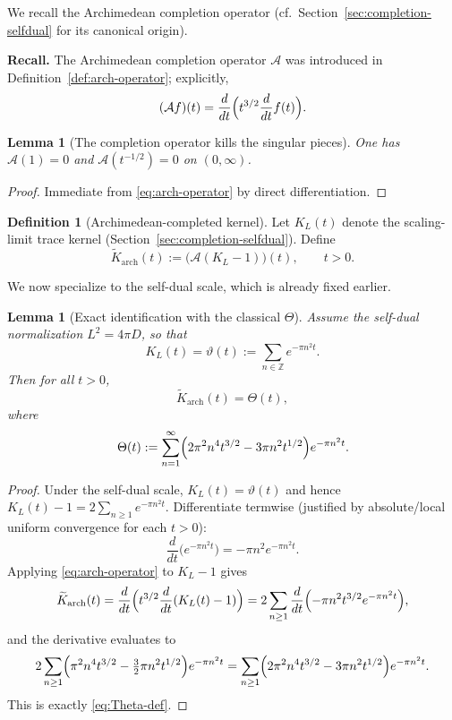 \documentclass[12pt]{amsart}
\newtheorem{lemma}[theorem]{Lemma}
\theoremstyle{definition}
\newtheorem{definition}[theorem]{Definition}
\theoremstyle{remark}
\begin{document}
We recall the Archimedean completion operator (cf.\ Section~\ref{sec:completion-selfdual} for its canonical origin).

\noindent\textbf{Recall.} The Archimedean completion operator $\mathcal A$ was introduced in Definition~\ref{def:arch-operator}; explicitly,
\[
(\mathcal A f)(t)=\frac{d}{dt}\Bigl(t^{3/2}\frac{d}{dt}f(t)\Bigr).
\]



\begin{lemma}[The completion operator kills the singular pieces]
\label{lem:A-kills-singular-new}
One has $\mathcal A(1)=0$ and $\mathcal A(t^{-1/2})=0$ on $(0,\infty)$.
\end{lemma}

\begin{proof}
Immediate from \eqref{eq:arch-operator} by direct differentiation.
\end{proof}

\begin{definition}[Archimedean-completed kernel]
\label{def:arch-kernel-new}
Let $K_L(t)$ denote the scaling-limit trace kernel (Section~\ref{sec:completion-selfdual}). Define
\begin{equation}
\label{eq:Karch-def}
\widetilde K_{\mathrm{arch}}(t)
:=\bigl(\mathcal A (K_L-1)\bigr)(t),\qquad t>0.
\end{equation}
\end{definition}

We now specialize to the self-dual scale, which is already fixed earlier.

\begin{lemma}[Exact identification with the classical $\Theta$]
\label{lem:arch-equals-Theta-new}
Assume the self-dual normalization $L^2=4\pi D$, so that
\[
K_L(t)=\vartheta(t):=\sum_{n\in\mathbb Z}e^{-\pi n^2 t}.
\]
Then for all $t>0$,
\begin{equation}
\label{eq:Karch-equals-Theta}
\widetilde K_{\mathrm{arch}}(t)=\Theta(t),
\end{equation}
where
\begin{equation}
\label{eq:Theta-def}
\Theta(t)
:=\sum_{n=1}^{\infty}\Bigl(2\pi^2 n^4 t^{3/2}-3\pi n^2 t^{1/2}\Bigr)e^{-\pi n^2 t}.
\end{equation}
\end{lemma}

\begin{proof}
Under the self-dual scale, $K_L(t)=\vartheta(t)$ and hence
$K_L(t)-1=2\sum_{n\ge 1}e^{-\pi n^2 t}$.
Differentiate termwise (justified by absolute/local uniform convergence for each $t>0$):
\[
\frac{d}{dt}\bigl(e^{-\pi n^2 t}\bigr)=-\pi n^2 e^{-\pi n^2 t}.
\]
Applying \eqref{eq:arch-operator} to $K_L-1$ gives
\[
\widetilde K_{\mathrm{arch}}(t)
=
\frac{d}{dt}\Bigl(t^{3/2}\frac{d}{dt}(K_L(t)-1)\Bigr)
=
2\sum_{n\ge 1}\frac{d}{dt}\Bigl(-\pi n^2 t^{3/2}e^{-\pi n^2 t}\Bigr),
\]
and the derivative evaluates to
\[
2\sum_{n\ge 1}\Bigl(\pi^2 n^4 t^{3/2}-\tfrac32\pi n^2 t^{1/2}\Bigr)e^{-\pi n^2 t}
=
\sum_{n\ge 1}\Bigl(2\pi^2 n^4 t^{3/2}-3\pi n^2 t^{1/2}\Bigr)e^{-\pi n^2 t}.
\]
This is exactly \eqref{eq:Theta-def}.
\end{proof}
\end{document}
